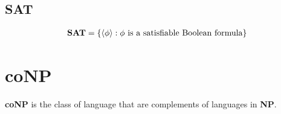\subsection{SAT} \label{sec:}

\begin{align}
    \text{\textbf{SAT}} = \{ \left<\phi \right> : \phi \text{ is a satisfiable Boolean formula}\}
\end{align}

\section{coNP} \label{sec:}
\begin{definition}[coNP]
    \textbf{coNP} is the class of language that are complements of languages in \textbf{NP}.
\end{definition}



